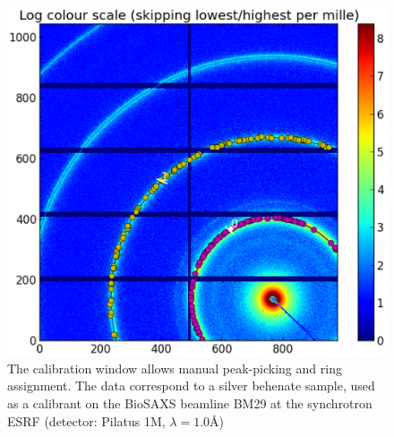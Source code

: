 \documentclass[preprint]{iucr}
\begin{document}
\begin{figure}
\label{calib}
\begin{center}
\includegraphics[width=15cm]{calib.eps}
\caption{The calibration window allows manual peak-picking and
ring assignment. The data correspond to a silver behenate sample, used as a
calibrant on the BioSAXS beamline BM29 at the synchrotron ESRF
(detector: Pilatus 1M, $\lambda=1.0${\AA})}
\end{center}
\end{figure}
\end{document}
